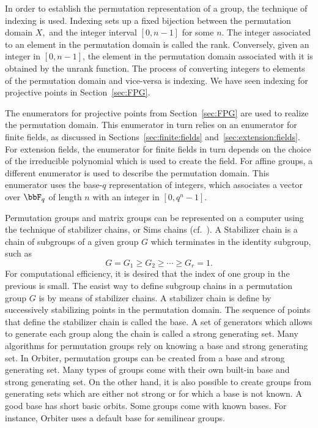 \bigskip




In order to establish the permutation representation of a group, 
the technique of indexing is used. 
Indexing sets up a fixed bijection between the permutation domain $X,$
and the integer interval $[0,n-1]$ for some $n$. 
The integer associated to an element in the permutation domain is called the rank. 
Conversely, given an integer in $[0,n-1]$, 
the element in the permutation domain associated with it 
is obtained by the unrank function. 
The process of converting integers to elements of the permutation domain and vice-versa is indexing. 
We have seen indexing for projective points in Section~\ref{sec:FPG}. 



\bigskip

The enumerators for projective points from Section~\ref{sec:FPG} 
are used to realize the permutation domain. 
This enumerator in turn relies on an enumerator for finite fields, 
as discussed in Sections~\ref{sec:finite:fields} and~\ref{sec:extension:fields}.
For extension fields, 
the enumerator for finite fields in turn depends on the choice of 
the irreducible polynomial which is used to create the field. 
For affine groups, a different enumerator is used to describe the permutation domain. 
This enumerator uses the base-$q$ representation of integers, 
which associates a vector over $\bbF_q$  of length $n$
with an integer in $[0,q^n-1].$

\bigskip


Permutation groups and matrix groups 
can be represented on a computer using the technique of stabilizer chains, or Sims chains 
(cf.~\cite{Holt05,Seress03}). 
A Stabilizer chain is a chain of subgroups of a given group $G$ which 
terminates in the identity subgroup, such as 
$$
G=G_1 \ge G_2 \ge \cdots \ge G_r = 1.
$$
For computational efficiency, 
it is desired that the index of one group in the previous is small. 
The easist way to define subgroup chains in a permutation group $G$ 
is by means of stabilizer chains. 
A stabilizer chain is define by successively stabilizing points in the permutation domain. 
The sequence of points that define the stabilizer chain is called the base. 
A set of generators which allows 
to generate each group along the chain is called a strong generating set. 
Many algorithms for permutation groups rely on knowing a base and strong generating set. 
In Orbiter, permutation groups can be created from a base and strong generating set. 
Many types of groups come with their own built-in base and strong generating set. 
On the other hand, it is also possible to create 
groups from generating sets which are either not strong or 
for which a base is not known. 
A good base has short basic orbits. 
Some groups come with known bases. 
For instance, 
Orbiter uses a default base for semilinear groups. 

